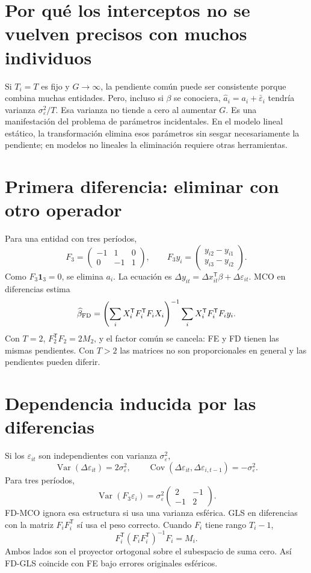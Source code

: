 \documentclass[11pt,a4paper]{article}
\newcommand{\T}{^{\mathsf T}}
\DeclareMathOperator{\Var}{Var}
\DeclareMathOperator{\Cov}{Cov}
\newcommand{\ones}{\mathbf 1}
\theoremstyle{definition}
\newcounter{problema}
\newcommand{\eps}{\varepsilon}
\begin{document}
\section{Por qué los interceptos no se vuelven precisos con muchos individuos}
Si $T_i=T$ es fijo y $G\to\infty$, la pendiente común puede ser consistente porque combina muchas entidades. Pero, incluso si $\beta$ se conociera,
$\widehat a_i=a_i+\bar\eps_i$ tendría varianza $\sigma_\eps^2/T$.
Esa varianza no tiende a cero al aumentar $G$. Es una manifestación del problema de parámetros incidentales. En el modelo lineal estático, la transformación elimina esos parámetros sin sesgar necesariamente la pendiente; en modelos no lineales la eliminación requiere otras herramientas.

\section{Primera diferencia: eliminar con otro operador}
Para una entidad con tres períodos,
\[
F_3=\begin{pmatrix}-1&1&0\\0&-1&1\end{pmatrix},
\qquad
F_3y_i=\begin{pmatrix}y_{i2}-y_{i1}\\y_{i3}-y_{i2}\end{pmatrix}.
\]
Como $F_3\ones_3=0$, se elimina $a_i$. La ecuación es
$\Delta y_{it}=\Delta x_{it}\T\beta+\Delta\eps_{it}$.
MCO en diferencias estima
\[
\widehat\beta_{\rm FD}
=\left(\sum_iX_i\T F_i\T F_iX_i\right)^{-1}
\sum_iX_i\T F_i\T F_iy_i.
\]
Con $T=2$, $F_2\T F_2=2M_2$, y el factor común se cancela: FE y FD tienen las mismas pendientes. Con $T>2$ las matrices no son proporcionales en general y las pendientes pueden diferir.

\section{Dependencia inducida por las diferencias}
Si los $\eps_{it}$ son independientes con varianza $\sigma_\eps^2$,
\[
\Var(\Delta\eps_{it})=2\sigma_\eps^2,\qquad
\Cov(\Delta\eps_{it},\Delta\eps_{i,t-1})=-\sigma_\eps^2.
\]
Para tres períodos,
\[
\Var(F_3\eps_i)=\sigma_\eps^2
\begin{pmatrix}2&-1\\-1&2\end{pmatrix}.
\]
FD-MCO ignora esa estructura si usa una varianza esférica. GLS en diferencias con la matriz $F_iF_i\T$ sí usa el peso correcto. Cuando $F_i$ tiene rango $T_i-1$,
\[
F_i\T(F_iF_i\T)^{-1}F_i=M_i.
\]
Ambos lados son el proyector ortogonal sobre el subespacio de suma cero. Así FD-GLS coincide con FE bajo errores originales esféricos.
\end{document}
